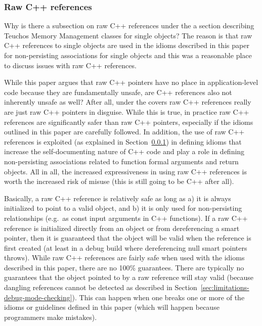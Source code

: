 \documentclass[pdf,ps2pdf,11pt]{SANDreport}
\begin{document}
%
{}\subsubsection{Raw C++ references}
\label{sec:raw-C++-references}
%

Why is there a subsection on raw C++ references under the a section
describing Teuchos Memory Management classes for single objects?  The
reason is that raw C++ references to single objects are used in the
idioms described in this paper for non-persisting associations for
single objects and this was a reasonable place to discuss issues with
raw C++ references.

While this paper argues that raw C++ pointers have no place in
application-level code because they are fundamentally unsafe, are C++
references also not inherently unsafe as well?  After all, under the
covers raw C++ references really are just raw C++ pointers in
disguise.  While this is true, in practice raw C++ references are
significantly safer than raw C++ pointers, especially if the idioms
outlined in this paper are carefully followed.  In addition, the use
of raw C++ references is exploited (as explained in
Section~\ref{sec:raw-C++-references}) in defining idioms that increase
the self-documenting nature of C++ code and play a role in defining
non-persisting associations related to function formal arguments and
return objects.  All in all, the increased expressiveness in using raw
C++ references is worth the increased risk of misuse (this is still
going to be C++ after all).

Basically, a raw C++ reference is relatively safe as long as a) it is
always initialized to point to a valid object, and b) it is only used
for non-persisting relationships (e.g.\ as const input arguments in
C++ functions).  If a raw C++ reference is initialized directly from
an object or from dereferencing a smart pointer, then it is guaranteed
that the object will be valid when the reference is first created (at
least in a debug build where dereferencing null smart pointers
throws).  While raw C++ references are fairly safe when used with the
idioms described in this paper, there are no 100\% guarantees.  There
are typically no guarantees that the object pointed to by a raw
reference will stay valid (because dangling references cannot be
detected as described in
Section~\ref{sec:limitations-debug-mode-checking}).  This can happen
when one breaks one or more of the idioms or guidelines defined in
this paper (which will happen because programmers make mistakes).
\end{document}
